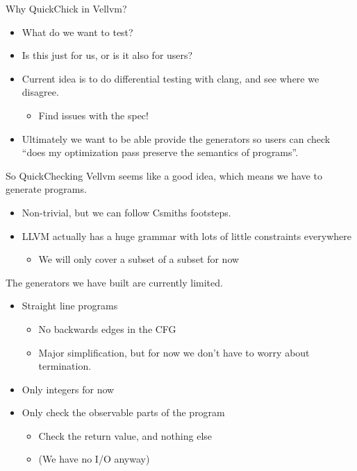 \documentclass{beamer}
\begin{document}
\begin{frame}
  Why QuickChick in Vellvm?

  \begin{itemize}
  \item What do we want to test?
  \item Is this just for us, or is it also for users?
  \item Current idea is to do differential testing with clang, and see
    where we disagree.
    \begin{itemize}
    \item Find issues with the spec!
    \end{itemize}
  \item Ultimately we want to be able provide the generators so users
    can check ``does my optimization pass preserve the semantics of programs''.
  \end{itemize}
\end{frame}

\begin{frame}
  So QuickChecking Vellvm seems like a good idea, which means we have
  to generate programs.

  \begin{itemize}
  \item Non-trivial, but we can follow Csmiths footsteps.
  \item LLVM actually has a huge grammar with lots of little
    constraints everywhere
    \begin{itemize}
    \item We will only cover a subset of a subset for now
    \end{itemize}
  \end{itemize}
\end{frame}

\begin{frame}
  The generators we have built are currently limited.

  \begin{itemize}
  \item Straight line programs
    \begin{itemize}
    \item No backwards edges in the CFG
    \item Major simplification, but for now we don't have to worry
      about termination.
    \end{itemize}
  \item Only integers for now
  \item Only check the observable parts of the program
    \begin{itemize}
    \item Check the return value, and nothing else
    \item (We have no I/O anyway)
    \end{itemize}
  \end{itemize}
\end{frame}
\end{document}

